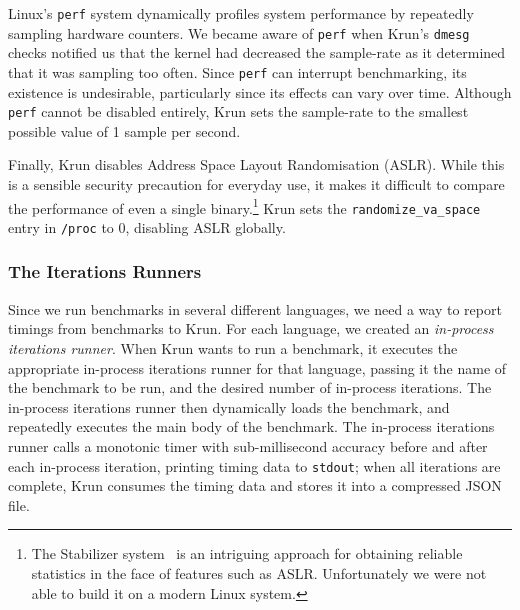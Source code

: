 \documentclass[a4paper,UKenglish]{lipics}
\newcommand{\krun}{Krun\xspace}
\begin{document}
Linux's \texttt{perf} system dynamically profiles system performance by
repeatedly sampling hardware counters. We became aware of \texttt{perf} when
\krun's \texttt{dmesg} checks notified us that the kernel had decreased the
sample-rate as it determined that it was sampling too often. Since \texttt{perf}
can interrupt benchmarking, its existence is undesirable, particularly since its
effects can vary over time. Although \texttt{perf} cannot be disabled entirely,
\krun sets the sample-rate to the smallest possible value of 1 sample per
second.

Finally, \krun disables Address Space Layout Randomisation (ASLR). While this is
a sensible security precaution for everyday use, it makes it difficult to
compare the performance of even a single binary.\footnote{The Stabilizer
system~\cite{curtsinger13stabilizer} is an intriguing approach for obtaining reliable
statistics in the face of features such as ASLR. Unfortunately we were not able
to build it on a modern Linux system.} \krun sets the
\texttt{randomize\_va\_space} entry in \texttt{/proc} to 0, disabling ASLR
globally.


%
%
%


\subsubsection{The Iterations Runners}

Since we run benchmarks in several different languages, we need a way to report
timings from benchmarks to \krun. For each language, we created an
\emph{in-process iterations runner}. When \krun wants to run a benchmark, it executes the
appropriate in-process iterations runner for that language, passing it the name of the
benchmark to be run, and the desired number of in-process iterations. The in-process iterations runner
then dynamically loads the benchmark, and repeatedly executes the main body of
the benchmark. The in-process iterations runner calls a monotonic timer with
sub-millisecond accuracy before and after each in-process iteration, printing timing
data to \texttt{stdout}; when all iterations are complete, \krun consumes
the timing data and stores it into a compressed JSON file.
\end{document}
